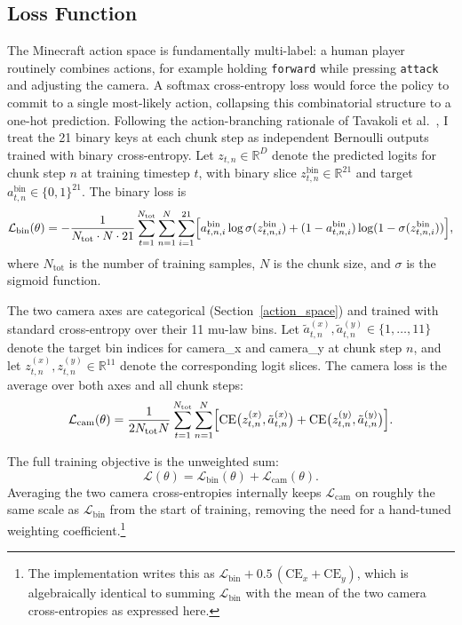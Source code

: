 \subsection{Loss Function} \label{sec:loss}
The Minecraft action space is fundamentally multi-label: a human player
routinely combines actions, for example holding \texttt{forward} while
pressing \texttt{attack} and adjusting the camera. A softmax cross-entropy
loss would force the policy to commit to a single most-likely action,
collapsing this combinatorial structure to a one-hot prediction. Following
the action-branching rationale of Tavakoli et
al.~\cite{tavakoli2018actionbranching}, I treat the 21 binary keys at each
chunk step as independent Bernoulli outputs trained with binary
cross-entropy. Let $z_{t,n} \in \mathbb{R}^D$ denote the predicted logits
for chunk step $n$ at training timestep $t$, with binary slice
$z^{\mathrm{bin}}_{t,n} \in \mathbb{R}^{21}$ and target
$a^{\mathrm{bin}}_{t,n} \in \{0,1\}^{21}$. The binary loss is
\begin{equation}
    \mathcal{L}_{\mathrm{bin}}(\theta) = -\frac{1}{N_{\mathrm{tot}} \cdot N \cdot 21}
    \sum_{t=1}^{N_{\mathrm{tot}}} \sum_{n=1}^{N} \sum_{i=1}^{21}
    \Bigl[ a^{\mathrm{bin}}_{t,n,i} \log \sigma(z^{\mathrm{bin}}_{t,n,i})
         + (1 - a^{\mathrm{bin}}_{t,n,i}) \log(1 - \sigma(z^{\mathrm{bin}}_{t,n,i})) \Bigr],
\end{equation}
where $N_{\mathrm{tot}}$ is the number of training samples, $N$ is the chunk
size, and $\sigma$ is the sigmoid function.

The two camera axes are categorical (Section~\ref{action_space}) and trained
with standard cross-entropy over their 11 mu-law bins. Let
$\tilde{a}^{(x)}_{t,n}, \tilde{a}^{(y)}_{t,n} \in \{1, \dots, 11\}$ denote
the target bin indices for camera_x and camera_y at chunk step $n$, and let
$z^{(x)}_{t,n}, z^{(y)}_{t,n} \in \mathbb{R}^{11}$ denote the corresponding
logit slices. The camera loss is the average over both axes and all chunk
steps:
\begin{equation}
    \mathcal{L}_{\mathrm{cam}}(\theta) = \frac{1}{2 N_{\mathrm{tot}} N}
    \sum_{t=1}^{N_{\mathrm{tot}}} \sum_{n=1}^{N}
    \Bigl[ \mathrm{CE}\bigl(z^{(x)}_{t,n}, \tilde{a}^{(x)}_{t,n}\bigr)
         + \mathrm{CE}\bigl(z^{(y)}_{t,n}, \tilde{a}^{(y)}_{t,n}\bigr) \Bigr].
\end{equation}

The full training objective is the unweighted sum:
\begin{equation}
    \mathcal{L}(\theta) = \mathcal{L}_{\mathrm{bin}}(\theta) + \mathcal{L}_{\mathrm{cam}}(\theta).
\end{equation}
Averaging the two camera cross-entropies internally keeps
$\mathcal{L}_{\mathrm{cam}}$ on roughly the same scale as
$\mathcal{L}_{\mathrm{bin}}$ from the start of training, removing the need
for a hand-tuned weighting coefficient.\footnote{The implementation writes
this as $\mathcal{L}_{\mathrm{bin}} + 0.5\,(\mathrm{CE}_x + \mathrm{CE}_y)$,
which is algebraically identical to summing $\mathcal{L}_{\mathrm{bin}}$
with the mean of the two camera cross-entropies as expressed here.}

